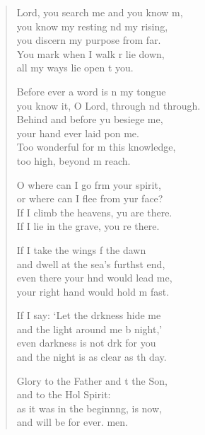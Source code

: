 \settowidth{\versewidth}{you know it, O Lord, through and through.}
\begin{verse}%
  \begin{patverse}
 Lord, you search me and you know m,\Flex\\
you know my resting nd my rising,\Med\\
you discern my purpose from far.\\
You mark when I walk r lie down,\Med\\
all my ways lie open t you.

Before ever a word is n my tongue\Med\\
you know it, O Lord, through nd through.\\
Behind and before yu besiege me,\Med\\
your hand ever laid pon me.\\
Too wonderful for m this knowledge,\Med\\
too high, beyond m reach.

O where can I go frm your spirit,\Med\\
or where can I flee from yur face?\\
If I climb the heavens, yu are there.\Med\\
If I lie in the grave, you re there.

If I take the wings f the dawn\Med\\
and dwell at the sea’s furthst end,\\
even there your hnd would lead me,\Med\\
your right hand would hold m fast.

If I say: ‘Let the drkness hide me\Med\\
and the light around me b night,’\\
even darkness is not drk for you\Med\\
and the night is as clear as th day.

Glory to the Father and t the Son,\Med\\
and to the Hol Spirit:\\
as it was in the beginn\pointup{\i}ng, is now,\Med\\
and will be for ever. men.
  \end{patverse}
\end{verse}
